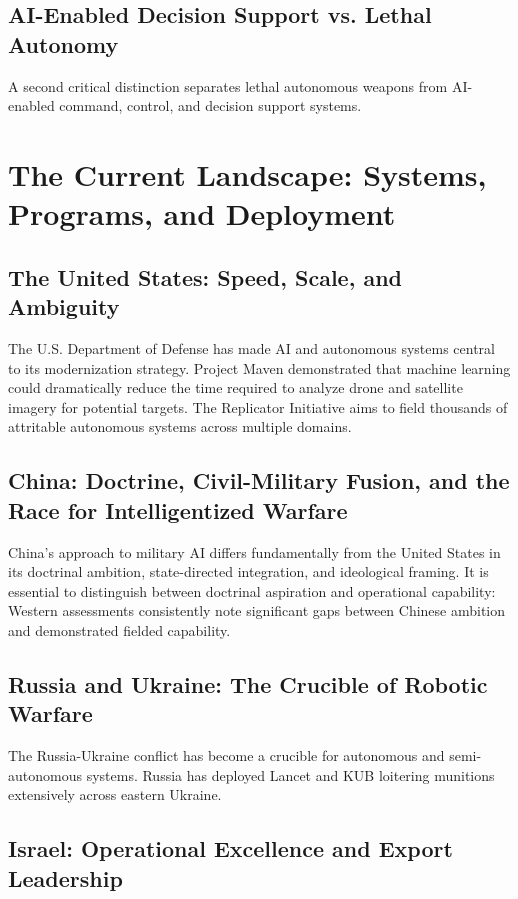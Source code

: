 \documentclass[11pt,a4paper]{article}
\begin{document}
\subsection{AI-Enabled Decision Support vs. Lethal Autonomy}

A second critical distinction separates lethal autonomous weapons from AI-enabled command, control, and decision support systems.

\section{The Current Landscape: Systems, Programs, and Deployment}

\subsection{The United States: Speed, Scale, and Ambiguity}

The U.S. Department of Defense has made AI and autonomous systems central to its modernization strategy. Project Maven demonstrated that machine learning could dramatically reduce the time required to analyze drone and satellite imagery for potential targets. The Replicator Initiative aims to field thousands of attritable autonomous systems across multiple domains.

\subsection{China: Doctrine, Civil-Military Fusion, and the Race for Intelligentized Warfare}

China's approach to military AI differs fundamentally from the United States in its doctrinal ambition, state-directed integration, and ideological framing. It is essential to distinguish between doctrinal aspiration and operational capability: Western assessments consistently note significant gaps between Chinese ambition and demonstrated fielded capability.

\subsection{Russia and Ukraine: The Crucible of Robotic Warfare}

The Russia-Ukraine conflict has become a crucible for autonomous and semi-autonomous systems. Russia has deployed Lancet and KUB loitering munitions extensively across eastern Ukraine.

\subsection{Israel: Operational Excellence and Export Leadership}
\end{document}

